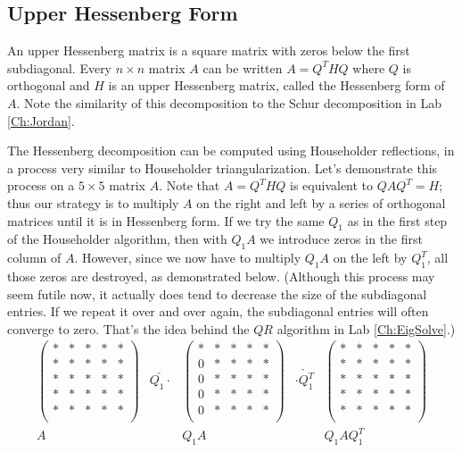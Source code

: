 \subsection*{Upper Hessenberg Form}

An upper Hessenberg matrix is a square matrix with zeros below the first subdiagonal. Every  $n \times n$ matrix $A$ can be written $A = Q^THQ$ where $Q$ is orthogonal and $H$ is an upper Hessenberg matrix, called the Hessenberg form of $A$. Note the similarity of this decomposition to the Schur decomposition in Lab \ref{Ch:Jordan}. 

The Hessenberg decomposition can be computed using Householder reflections, in a process very similar to Householder triangularization. Let's demonstrate this process on a $5 \times 5$ matrix $A$. Note that $A=Q^THQ$ is equivalent to $QAQ^T = H$; thus our strategy is to multiply $A$ on the right and left by a series of orthogonal matrices until it is in Hessenberg form. If we try the same $Q_1$ as in the first step of the Householder algorithm, then with $Q_1 A$ we introduce zeros in the first column of $A$. However, since we now have to multiply $Q_1 A$ on the left by $Q_1^T$, all those zeros are destroyed, as demonstrated below. (Although this process may seem futile now, it actually does tend to decrease the size of the subdiagonal entries. If we repeat it over and over again, the subdiagonal entries will often converge to zero. That's the idea behind the $QR$ algorithm in Lab \ref{Ch:EigSolve}.)
\[
\begin{array}{ccccc} 
\begin{pmatrix}
* & * & * & * & *\\
* & * & * & * & *\\
* & * & * & * & *\\
* & * & * & * & *\\
* & * & * & * & *\\
\end{pmatrix} 
&\underrightarrow{Q_1 \cdot }&
\begin{pmatrix}
* & * & * & * & *\\
0 & * & * & * & *\\
0 & * & * & * & *\\
0 & * & * & * & *\\
0 & * & * & * & *\\
\end{pmatrix} 
&\underrightarrow{\cdot Q_1^T }&
\begin{pmatrix}
* & * & * & * & *\\
* & * & * & * & *\\
* & * & * & * & *\\
* & * & * & * & *\\
* & * & * & * & *\\
\end{pmatrix} 
\\ 
A & & Q_1A & & Q_1 A Q_1^T
  \end{array}
\]
